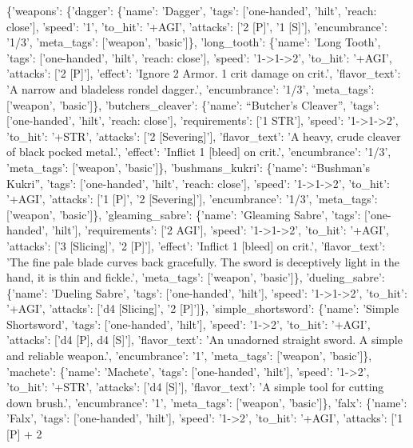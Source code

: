 \documentclass[
  letterpaper,
  DIV=11,
  numbers=noendperiod]{scrartcl}
\begin{document}
{\{'weapons': \{'dagger': \{'name': 'Dagger', 'tags': {[}'one-handed',
'hilt', 'reach: close'{]}, 'speed': '1', 'to\_hit': '+AGI', 'attacks':
{[}'2 {[}P{]}', '1 {[}S{]}'{]}, 'encumbrance': '1/3', 'meta\_tags':
{[}'weapon', 'basic'{]}\}, 'long\_tooth': \{'name': 'Long Tooth',
'tags': {[}'one-handed', 'hilt', 'reach: close'{]}, 'speed':
'1-\textgreater1-\textgreater2', 'to\_hit': '+AGI', 'attacks': {[}'2
{[}P{]}'{]}, 'effect': 'Ignore 2 Armor. 1 crit damage on crit.',
'flavor\_text': 'A narrow and bladeless rondel dagger.', 'encumbrance':
'1/3', 'meta\_tags': {[}'weapon', 'basic'{]}\}, 'butchers\_cleaver':
\{'name': ``Butcher's Cleaver'', 'tags': {[}'one-handed', 'hilt',
'reach: close'{]}, 'requirements': {[}'1 STR'{]}, 'speed':
'1-\textgreater1-\textgreater2', 'to\_hit': '+STR', 'attacks': {[}'2
{[}Severing{]}'{]}, 'flavor\_text': 'A heavy, crude cleaver of black
pocked metal.', 'effect': 'Inflict 1 {[}bleed{]} on crit.',
'encumbrance': '1/3', 'meta\_tags': {[}'weapon', 'basic'{]}\},
'bushmans\_kukri': \{'name': ``Bushman's Kukri'', 'tags':
{[}'one-handed', 'hilt', 'reach: close'{]}, 'speed':
'1-\textgreater1-\textgreater2', 'to\_hit': '+AGI', 'attacks': {[}'1
{[}P{]}', '2 {[}Severing{]}'{]}, 'encumbrance': '1/3', 'meta\_tags':
{[}'weapon', 'basic'{]}\}, 'gleaming\_sabre': \{'name': 'Gleaming
Sabre', 'tags': {[}'one-handed', 'hilt'{]}, 'requirements': {[}'2
AGI'{]}, 'speed': '1-\textgreater1-\textgreater2', 'to\_hit': '+AGI',
'attacks': {[}'3 {[}Slicing{]}', '2 {[}P{]}'{]}, 'effect': 'Inflict 1
{[}bleed{]} on crit.', 'flavor\_text': 'The fine pale blade curves back
gracefully. The sword is deceptively light in the hand, it is thin and
fickle.', 'meta\_tags': {[}'weapon', 'basic'{]}\}, 'dueling\_sabre':
\{'name': 'Dueling Sabre', 'tags': {[}'one-handed', 'hilt'{]}, 'speed':
'1-\textgreater1-\textgreater2', 'to\_hit': '+AGI', 'attacks': {[}'d4
{[}Slicing{]}', '2 {[}P{]}'{]}\}, 'simple\_shortsword': \{'name':
'Simple Shortsword', 'tags': {[}'one-handed', 'hilt'{]}, 'speed':
'1-\textgreater2', 'to\_hit': '+AGI', 'attacks': {[}'d4 {[}P{]}, d4
{[}S{]}'{]}, 'flavor\_text': 'An unadorned straight sword. A simple and
reliable weapon.', 'encumbrance': '1', 'meta\_tags': {[}'weapon',
'basic'{]}\}, 'machete': \{'name': 'Machete', 'tags': {[}'one-handed',
'hilt'{]}, 'speed': '1-\textgreater2', 'to\_hit': '+STR', 'attacks':
{[}'d4 {[}S{]}'{]}, 'flavor\_text': 'A simple tool for cutting down
brush.', 'encumbrance': '1', 'meta\_tags': {[}'weapon', 'basic'{]}\},
'falx': \{'name': 'Falx', 'tags': {[}'one-handed', 'hilt'{]}, 'speed':
'1-\textgreater2', 'to\_hit': '+AGI', 'attacks': {[}'1 {[}P{]} + 2
}
\end{document}
